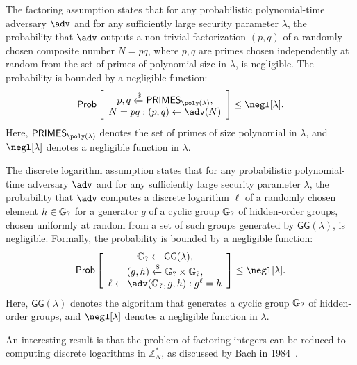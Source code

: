 \documentclass{iacrcc}
\begin{document}
\begin{definition}
The factoring assumption states that for any probabilistic polynomial-time adversary $\adv$ and for any sufficiently large security parameter $\lambda$, the probability that $\adv$ outputs a non-trivial factorization $(p, q)$ of a randomly chosen composite number $N = pq$, where $p, q$ are primes chosen independently at random from the set of primes of polynomial size in $\lambda$, is negligible. The probability is bounded by a negligible function:
\[
\Pr
\left[
\begin{array}{c}
p, q \xleftarrow{\$} \mathsf{PRIMES}_{\poly(\lambda)}, \\
N = pq : (p,q) \leftarrow \adv(N)
\end{array}
\right] \leq \negl[\lambda].
\]
Here, $\mathsf{PRIMES}_{\poly(\lambda)}$ denotes the set of primes of size polynomial in $\lambda$, and $\negl[\lambda]$ denotes a negligible function in $\lambda$.
\end{definition}

\begin{definition}
The discrete logarithm assumption states that for any probabilistic polynomial-time adversary $\adv$ and for any sufficiently large security parameter $\lambda$, the probability that $\adv$ computes a discrete logarithm $\ell$ of a randomly chosen element $h \in \mathbb{G}_{?}$ for a generator $g$ of a cyclic group $\mathbb{G}_{?}$ of hidden-order groups, chosen uniformly at random from a set of such groups generated by $\mathsf{GG}(\lambda)$, is negligible. Formally, the probability is bounded by a negligible function:
\[
\Pr
\left[
\begin{array}{c}
\hidgrp \leftarrow \mathsf{GG}(\lambda),           \\
(g, h) \xleftarrow{\$} \hidgrp \times \hidgrp,     \\
\ell \leftarrow \adv(\hidgrp, g, h) : g^{\ell} = h
\end{array}
\right] \leq \negl[\lambda].
\]
Here, $\mathsf{GG}(\lambda)$ denotes the algorithm that generates a cyclic group $\mathbb{G}_{?}$ of hidden-order groups, and $\negl[\lambda]$ denotes a negligible function in $\lambda$.
\end{definition}

An interesting result is that the problem of factoring integers can be reduced to computing discrete logarithms in $\mathbb{Z}_{N}^{*}$, as discussed by Bach in 1984~\cite{Bach1984}.
\end{document}
